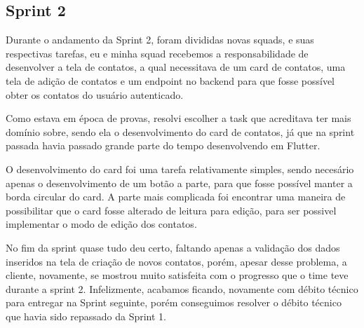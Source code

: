 \subsection{Sprint 2}

Durante o andamento da Sprint 2, foram divididas novas squads, e suas respectivas tarefas, eu e minha squad recebemos a responsabilidade de desenvolver a tela de contatos, a qual necessitava de um card de contatos, uma tela de adição de contatos e um endpoint no backend para que fosse possível obter os contatos do usuário autenticado.

Como estava em época de provas, resolvi escolher a task que acreditava ter mais domínio sobre, sendo ela o desenvolvimento do card de contatos, já que na sprint passada havia passado grande parte do tempo desenvolvendo em Flutter.

O desenvolvimento do card foi uma tarefa relativamente simples, sendo necesário apenas o desenvolvimento de um botão a parte, para que fosse possível manter a borda circular do card. A parte mais complicada foi encontrar uma maneira de possibilitar que o card fosse alterado de leitura para edição, para ser possivel implementar o modo de edição dos contatos.

No fim da sprint quase tudo deu certo, faltando apenas a validação dos dados inseridos na tela de criação de novos contatos, porém, apesar desse problema, a cliente, novamente, se mostrou muito satisfeita com o progresso que o time teve durante a sprint 2. Infelizmente, acabamos ficando, novamente com débito técnico para entregar na Sprint seguinte, porém conseguimos resolver o débito técnico que havia sido repassado da Sprint 1.